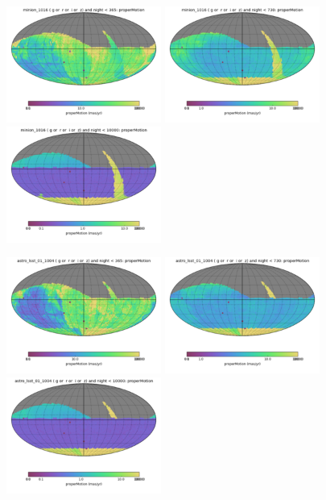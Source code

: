 \begin{figure}[ht]
  \begin{center}
  \includegraphics[width=2.0in]{./figs/milkyway/astromPanels/MW_Astrom_pmError_Baseline_01y_map.png}
  \includegraphics[width=2.0in]{./figs/milkyway/astromPanels/MW_Astrom_pmError_Baseline_02y_map.png}
  \includegraphics[width=2.0in]{./figs/milkyway/astromPanels/MW_Astrom_pmError_Baseline_10y_map.png}
  \end{center}
  \begin{center}
  \includegraphics[width=2.0in]{./figs/milkyway/astromPanels/MW_Astrom_pmError_wfdPlane_01y_map.png}
  \includegraphics[width=2.0in]{./figs/milkyway/astromPanels/MW_Astrom_pmError_wfdPlane_02y_map.png}
  \includegraphics[width=2.0in]{./figs/milkyway/astromPanels/MW_Astrom_pmError_wfdPlane_10y_map.png}
  \end{center}


\end{figure}
